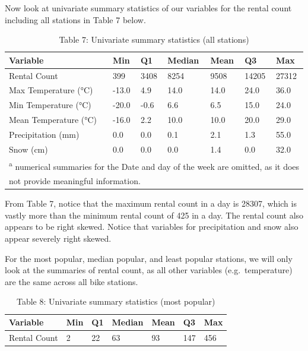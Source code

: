 \documentclass[
]{article}
\begin{document}
Now look at univariate summary statistics of our variables for the
rental count including all stations in Table 7 below.

\begin{table}[!h]

\caption{\label{tab:Table 7 univariate summary statistics (all stations)}Table 7: Univariate summary statistics (all stations)}
\centering
\begin{tabular}[t]{l|l|l|l|l|l|l}
\hline
Variable & Min & Q1 & Median & Mean & Q3 & Max\\
\hline
Rental Count & 399 & 3408 & 8254 & 9508 & 14205 & 27312\\
\hline
Max Temperature (°C) & -13.0 & 4.9 & 14.0 & 14.0 & 24.0 & 36.0\\
\hline
Min Temperature (°C) & -20.0 & -0.6 & 6.6 & 6.5 & 15.0 & 24.0\\
\hline
Mean Temperature (°C) & -16.0 & 2.2 & 10.0 & 10.0 & 20.0 & 29.0\\
\hline
Precipitation (mm) & 0.0 & 0.0 & 0.1 & 2.1 & 1.3 & 55.0\\
\hline
Snow (cm) & 0.0 & 0.0 & 0.0 & 1.4 & 0.0 & 32.0\\
\hline
\multicolumn{7}{l}{\textsuperscript{a} numerical summaries for the Date and day of the week are omitted, as it does}\\
\multicolumn{7}{l}{not provide meaningful information.}\\
\end{tabular}
\end{table}

From Table 7, notice that the maximum rental count in a day is 28307,
which is vastly more than the minimum rental count of 425 in a day. The
rental count also appears to be right skewed. Notice that variables for
precipitation and snow also appear severely right skewed.

For the most popular, median popular, and least popular stations, we
will only look at the summaries of rental count, as all other variables
(e.g.~temperature) are the same across all bike stations.

\begin{table}[!h]

\caption{\label{tab:Table 8 univariate summary statistics (most popular)}Table 8: Univariate summary statistics (most popular)}
\centering
\begin{tabular}[t]{l|l|l|l|l|l|l}
\hline
Variable & Min & Q1 & Median & Mean & Q3 & Max\\
\hline
Rental Count & 2 & 22 & 63 & 93 & 147 & 456\\
\hline
\end{tabular}
\end{table}
\end{document}

